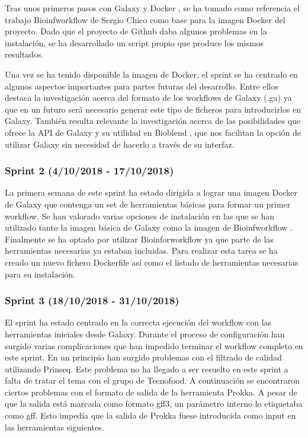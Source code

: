 Tras unos primeros pasos con Galaxy \cite{1} y Docker \cite{2}, se ha tomado como referencia el trabajo Bioinfworkflow de Sergio Chico \cite{3} como base para la imagen Docker del proyecto. Dado que el proyecto de Github daba algunos problemas en la instalación, se ha desarrollado un script propio que produce los mismos resultados.

Una vez se ha tenido disponible la imagen de Docker, el sprint se ha centrado en algunos aspectos importantes para partes futuras del desarrollo. Entre ellos destaca la investigación acerca del formato de los workflows de Galaxy (.ga) ya que en un futuro será necesario generar este tipo de ficheros para introducirlos en Galaxy. También resulta relevante la investigación acerca de las posibilidades que ofrece la API de Galaxy \cite{3} y su utilidad en Bioblend \cite{4}, que nos facilitan la opción de utilizar Galaxy sin necesidad de hacerlo a través de su interfaz.

\subsubsection{Sprint 2 (4/10/2018 - 17/10/2018)}
La primera semana de este sprint ha estado dirigida a lograr una imagen Docker de Galaxy que contenga un set de herramientas básicas para formar un primer workflow. Se han valorado varias opciones de instalación en las que se han utilizado tanto la imagen básica de Galaxy \cite{6} como la imagen de Bioinfworkflow \cite{3}. Finalmente se ha optado por utilizar Bioinforworkflow ya que parte de las herramientas necesarias ya estaban incluidas. 
Para realizar esta tarea se ha creado un nuevo fichero Dockerfile así como el listado de herramientas necesarias para su instalación.

\subsubsection{Sprint 3 (18/10/2018 - 31/10/2018)}
El sprint ha estado centrado en la correcta ejecución del workflow con las herramientas iniciales desde Galaxy. Durante el proceso de configuración han surgido varias complicaciones que han impedido terminar el workflow completo en este sprint. 
En un principio han surgido problemas con el filtrado de calidad utilizando Prinseq. Este problema no ha llegado a ser resuelto en este sprint a falta de tratar el tema con el grupo de Tecnofood.
A continuación se encontraron ciertos problemas con el formato de salida de la herramienta Prokka. A pesar de que la salida está marcada como formato gff3, un parámetro interno lo etiquetaba como gff. Esto impedía que la salida de Prokka fuese introducida como input en las herramientas siguientes.

